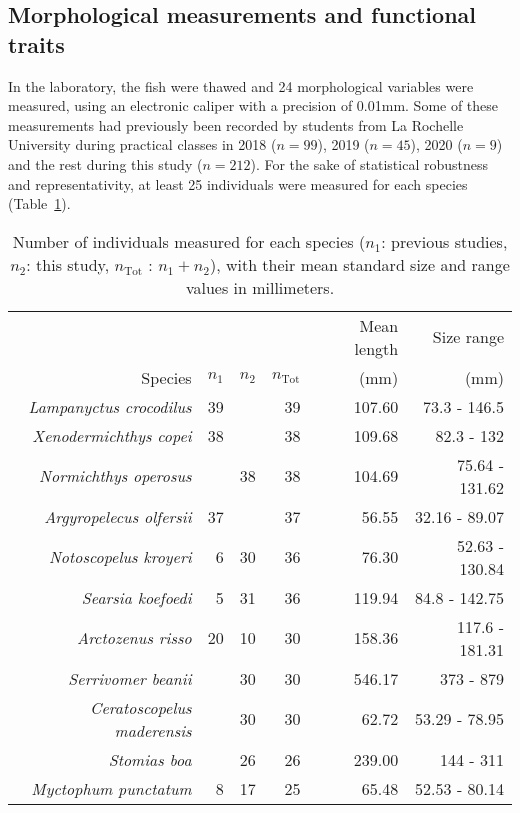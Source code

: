 \subsection{Morphological measurements and functional traits}
In the laboratory, the fish were thawed and 24 morphological variables were measured, using an electronic caliper with a precision of 0.01mm. Some of these measurements had previously been recorded by students from La Rochelle University during practical classes in 2018 ($n = 99$), 2019 ($n = 45$), 2020 ($n = 9$) and the rest during this study ($n = 212$). For the sake of statistical robustness and representativity, at least 25 individuals were measured for each species (Table~\ref{table:spcount}).  

\begin{table}[ht]
\centering
\caption[Count, size's mean and range values of species]{Number of individuals measured for each species ($n_1$: previous studies, $n_2$: this study, $n_\text{Tot}$ : $n_1 + n_2$), with their mean standard size and range values in millimeters.}
\label{table:spcount}

\begin{tabular}{rrrrrr}
  \toprule
        &                  &          &       & Mean length & Size range\\ 
Species & $n_1$  & $n_2$ & $n_\text{Tot}$ &   (mm) & (mm) \\ 
  \midrule
  \emph{Lampanyctus crocodilus} &  39 &    &  39 & 107.60 & 73.3 - 146.5 \\ 
  \emph{Xenodermichthys copei} &  38 &    &  38 & 109.68 & 82.3 - 132 \\ 
  \emph{Normichthys operosus} &    &  38 &  38 & 104.69 & 75.64 - 131.62 \\ 
  \emph{Argyropelecus olfersii} &  37 &    &  37 & 56.55 & 32.16 - 89.07 \\ 
  \emph{Notoscopelus kroyeri} &   6 &  30 &  36 & 76.30 & 52.63 - 130.84 \\ 
  \emph{Searsia koefoedi} &   5 &  31 &  36 & 119.94 & 84.8 - 142.75 \\ 
  \emph{Arctozenus risso} &  20 &  10 &  30 & 158.36 & 117.6 - 181.31 \\ 
  \emph{Serrivomer beanii} &    &  30 &  30 & 546.17 & 373 - 879 \\ 
  \emph{Ceratoscopelus maderensis} &    &  30 &  30 & 62.72 & 53.29 - 78.95 \\ 
  \emph{Stomias boa} &    &  26 &  26 & 239.00 & 144 - 311 \\ 
  \emph{Myctophum punctatum} &   8 &  17 &  25 & 65.48 & 52.53 - 80.14 \\ 
  \bottomrule
\end{tabular}
\end{table}

